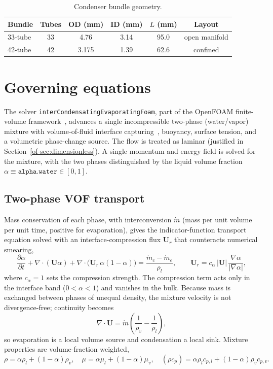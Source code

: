 \documentclass[11pt]{article}
\begin{document}
\begin{table}[H]
\centering\caption{Condenser bundle geometry.}\label{of-tab:cond}
\begin{tabular}{lccccc}
\toprule
Bundle & Tubes & OD (mm) & ID (mm) & $L$ (mm) & Layout\\
\midrule
33-tube & 33 & 4.76 & 3.14 & 95.0 & open manifold\\
42-tube & 42 & 3.175 & 1.39 & 62.6 & confined\\
\bottomrule
\end{tabular}
\end{table}

\section{Governing equations}
\label{of-sec:equations}
The solver \texttt{interCondensatingEvaporatingFoam}, part of the OpenFOAM finite-volume
framework~\cite{of-weller1998}, advances a single incompressible two-phase (water/vapor) mixture
with volume-of-fluid interface capturing~\cite{of-hirt1981}, buoyancy,
surface tension, and a volumetric phase-change source. The flow is treated as laminar
(justified in Section~\ref{of-sec:dimensionless}). A single momentum and energy field is
solved for the mixture, with the two phases distinguished by the liquid volume fraction
$\alpha\equiv\texttt{alpha.water}\in[0,1]$.

\subsection{Two-phase VOF transport}
Mass conservation of each phase, with interconversion $\dot m$ (mass per unit volume per
unit time, positive for evaporation), gives the indicator-function transport equation
solved with an interface-compression flux $\mathbf U_r$ that counteracts numerical
smearing,
\begin{equation}
\frac{\partial \alpha}{\partial t}+\nabla\!\cdot(\mathbf{U}\alpha)
+\nabla\!\cdot\!\big(\mathbf{U}_r\,\alpha(1-\alpha)\big)
=\frac{\dot m_c-\dot m_e}{\rho_l},
\qquad
\mathbf U_r=c_\alpha\,|\mathbf U|\,\frac{\nabla\alpha}{|\nabla\alpha|},
\label{of-eq:alpha}
\end{equation}
where $c_\alpha=1$ sets the compression strength. The compression term acts only in the
interface band ($0<\alpha<1$) and vanishes in the bulk. Because mass is exchanged between
phases of unequal density, the mixture velocity is not divergence-free; continuity becomes
\begin{equation}
\nabla\!\cdot\mathbf U=\dot m\!\left(\frac{1}{\rho_v}-\frac{1}{\rho_l}\right),
\label{of-eq:cont}
\end{equation}
so evaporation is a local volume source and condensation a local sink. Mixture properties
are volume-fraction weighted,
\begin{equation}
\rho=\alpha\rho_l+(1-\alpha)\rho_v,\quad
\mu=\alpha\mu_l+(1-\alpha)\mu_v,\quad
(\rho c_p)=\alpha\rho_l c_{p,l}+(1-\alpha)\rho_v c_{p,v}.
\end{equation}
\end{document}
